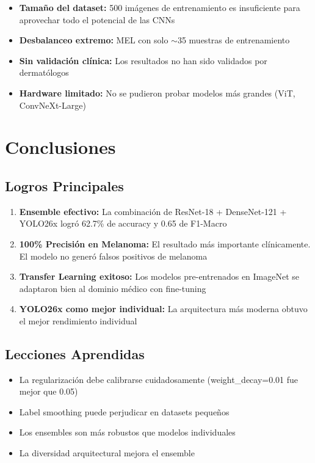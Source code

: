 \documentclass[12pt,a4paper]{article}
\begin{document}
\begin{itemize}
    \item \textbf{Tamaño del dataset:} 500 imágenes de entrenamiento es insuficiente para aprovechar todo el potencial de las CNNs
    \item \textbf{Desbalanceo extremo:} MEL con solo $\sim$35 muestras de entrenamiento
    \item \textbf{Sin validación clínica:} Los resultados no han sido validados por dermatólogos
    \item \textbf{Hardware limitado:} No se pudieron probar modelos más grandes (ViT, ConvNeXt-Large)
\end{itemize}

\newpage

\section{Conclusiones}

\subsection{Logros Principales}

\begin{enumerate}
    \item \textbf{Ensemble efectivo:} La combinación de ResNet-18 + DenseNet-121 + YOLO26x logró 62.7\% de accuracy y 0.65 de F1-Macro

    \item \textbf{100\% Precisión en Melanoma:} El resultado más importante clínicamente. El modelo no generó falsos positivos de melanoma

    \item \textbf{Transfer Learning exitoso:} Los modelos pre-entrenados en ImageNet se adaptaron bien al dominio médico con fine-tuning

    \item \textbf{YOLO26x como mejor individual:} La arquitectura más moderna obtuvo el mejor rendimiento individual
\end{enumerate}

\subsection{Lecciones Aprendidas}

\begin{itemize}
    \item La regularización debe calibrarse cuidadosamente (weight\_decay=0.01 fue mejor que 0.05)
    \item Label smoothing puede perjudicar en datasets pequeños
    \item Los ensembles son más robustos que modelos individuales
    \item La diversidad arquitectural mejora el ensemble
\end{itemize}
\end{document}
